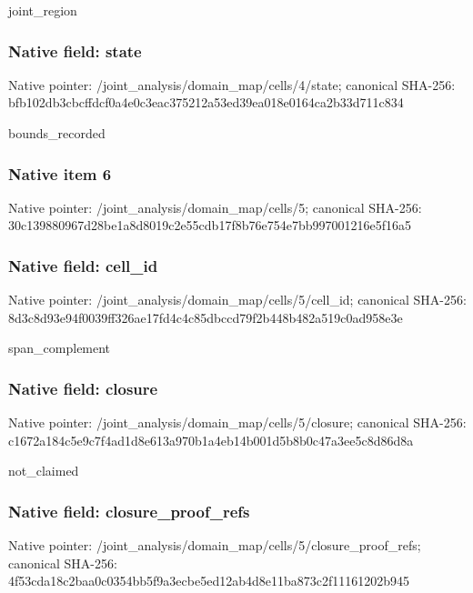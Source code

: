 \documentclass[10pt,a4paper]{article}
\begin{document}
\begingroup\raggedright\sloppy joint\_\allowbreak{}region\par\endgroup

\subsubsection{Native field: state}
Native pointer: /joint\_\allowbreak{}analysis/domain\_\allowbreak{}map/cells/4/state; canonical SHA-256: bfb102db3cbcffdcf0a4e0c3eac375212a53ed39ea018e0164ca2b33d711c834

\begingroup\raggedright\sloppy bounds\_\allowbreak{}recorded\par\endgroup

\subsubsection{Native item 6}
Native pointer: /joint\_\allowbreak{}analysis/domain\_\allowbreak{}map/cells/5; canonical SHA-256: 30c139880967d28be1a8d8019c2e55cdb17f8b76e754e7bb997001216e5f16a5

\subsubsection{Native field: cell\_\allowbreak{}id}
Native pointer: /joint\_\allowbreak{}analysis/domain\_\allowbreak{}map/cells/5/cell\_\allowbreak{}id; canonical SHA-256: 8d3c8d93e94f0039ff326ae17fd4c4c85dbccd79f2b448b482a519c0ad958e3e

\begingroup\raggedright\sloppy span\_\allowbreak{}complement\par\endgroup

\subsubsection{Native field: closure}
Native pointer: /joint\_\allowbreak{}analysis/domain\_\allowbreak{}map/cells/5/closure; canonical SHA-256: c1672a184c5e9c7f4ad1d8e613a970b1a4eb14b001d5b8b0c47a3ee5c8d86d8a

\begingroup\raggedright\sloppy not\_\allowbreak{}claimed\par\endgroup

\subsubsection{Native field: closure\_\allowbreak{}proof\_\allowbreak{}refs}
Native pointer: /joint\_\allowbreak{}analysis/domain\_\allowbreak{}map/cells/5/closure\_\allowbreak{}proof\_\allowbreak{}refs; canonical SHA-256: 4f53cda18c2baa0c0354bb5f9a3ecbe5ed12ab4d8e11ba873c2f11161202b945
\end{document}
